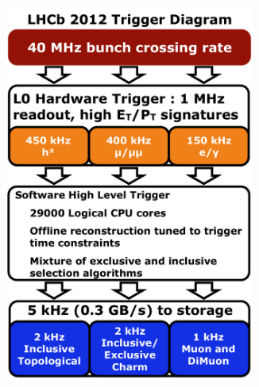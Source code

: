 \begin{figure}[!tb]
\begin{subfigure}{0.49\textwidth}
\includegraphics[width=0.9\textwidth]{figs/detector/trigger-runI.pdf}
\caption{}
\label{fig:trigger:runI}
\end{subfigure}
\begin{subfigure}{0.49\textwidth}

\end{subfigure}
\end{figure}
